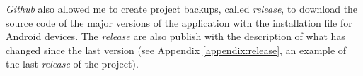\textit{Github} also allowed me to create project backups, called \textit{release}, to download the source code of the major versions of the application with the installation file for Android devices. The \textit{release} are also publish with the description of what has changed since the last version (see Appendix \ref{appendix:release}, an example of the last \textit{release} of the project).











